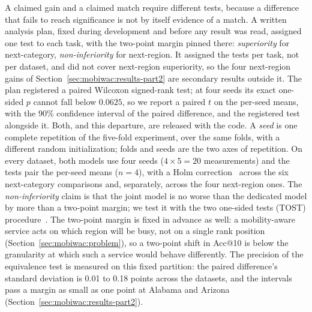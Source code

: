 A claimed gain and a claimed match require different tests, because a difference that fails to reach significance is not by itself evidence of a match. A written analysis plan, fixed during development and before any result was read, assigned one test to each task, with the two-point margin pinned there: \emph{superiority} for next-category, \emph{non-inferiority} for next-region. It assigned the tests per task, not per dataset, and did not cover next-region superiority, so the four next-region gains of Section~\ref{sec:mobiwac:results-part2} are secondary results outside it. The plan registered a paired Wilcoxon signed-rank test; at four seeds its exact one-sided $p$ cannot fall below $0.0625$, so we report a paired $t$ on the per-seed means, with the 90\% confidence interval of the paired difference, and the registered test alongside it. Both, and this departure, are released with the code. A \emph{seed} is one complete repetition of the five-fold experiment, over the same folds, with a different random initialization; folds and seeds are the two axes of repetition. On every dataset, both models use four seeds ($4\times5=20$ measurements) and the tests pair the per-seed means ($n{=}4$), with a Holm correction~\cite{holm1979} across the six next-category comparisons and, separately, across the four next-region ones. The \emph{non-inferiority} claim is that the joint model is no worse than the dedicated model by more than a two-point margin; we test it with the two one-sided tests (TOST) procedure~\cite{lakens2017tost}. The two-point margin is fixed in advance as well: a mobility-aware service acts on which region will be busy, not on a single rank position (Section~\ref{sec:mobiwac:problem}), so a two-point shift in Acc@10 is below the granularity at which such a service would behave differently. The precision of the equivalence test is measured on this fixed partition: the paired difference's standard deviation is 0.01 to 0.18 points across the datasets, and the intervals pass a margin as small as one point at Alabama and Arizona (Section~\ref{sec:mobiwac:results-part2}).
